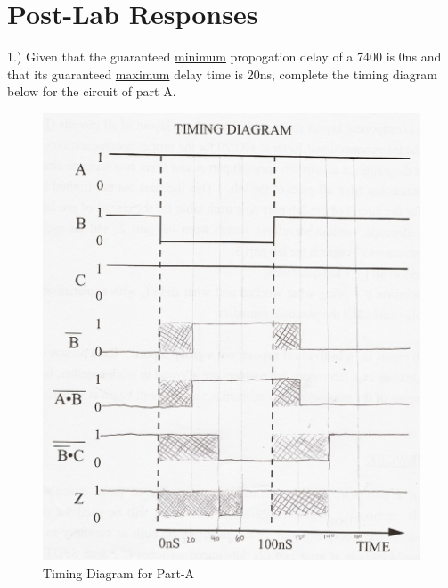 \documentclass{scrartcl}
\begin{document}
\section{Post-Lab Responses}
1.) Given that the guaranteed \underline{minimum} propogation delay of a 7400 is 0ns and that its guaranteed \underline{maximum} delay time is 20ns, complete the timing diagram below for the circuit of part A.
	\begin{figure} [H]
		\centering
		\includegraphics[scale = 0.4]{Timing_Diagram.jpeg}
		\caption{Timing Diagram for Part-A}
		\label{fig:timing-diagram}
	\end{figure}
	
\end{document}
